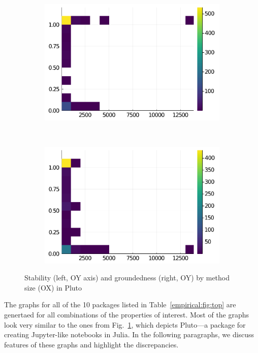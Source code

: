 \documentclass[oneside,openright,titlepage,numbers=noenddot,%
headinclude,footinclude,cleardoublepage=empty,abstract=on,
BCOR=5mm,paper=a4,fontsize=11pt,
dvipsnames
]{scrreprt}
\begin{document}
\begin{figure}[h]
\centering
     \begin{subfigure}[b]{0.35\textwidth}
       \includegraphics[width=\textwidth]{figs/Pluto-size-vs-stable.pdf}
     \end{subfigure}
     \ \ \
     \begin{subfigure}[b]{0.35\textwidth}
       \includegraphics[width=\textwidth]{figs/Pluto-size-vs-grounded.pdf}
     \end{subfigure}
\caption{Stability (left, OY axis) and groundedness (right, OY) by method size (OX) in Pluto}%
\label{figs:size:Pluto:main}
\end{figure}

The graphs for all of the 10 packages listed in
Table~\ref{empirical:fig:top} are genertaed for all combinations of the properties of
interest.
Most of the graphs look very similar to the ones from
Fig.~\ref{figs:size:Pluto:main}, which depicts Pluto---a package for creating
Jupyter-\hspace{0pt}like notebooks in Julia. In the following paragraphs, we
discuss features of these graphs and highlight the discrepancies.
\end{document}
